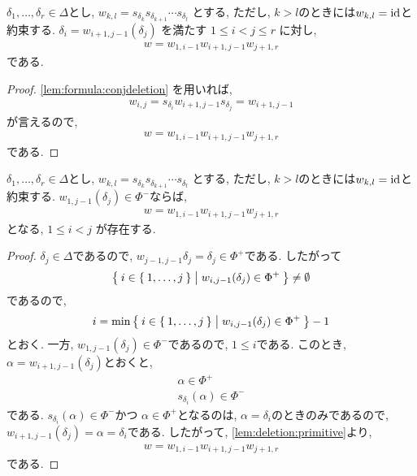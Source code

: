 \begin{lemma}
  \label{lem:deletion:primitive}
  $\delta_1,\ldots,\delta_r \in\Delta$とし,
  $w_{k,l}=s_{\delta_k}s_{\delta_{k+1}}\cdots s_{\delta_l}$
  とする, ただし, $k>l$のときには$w_{k,l}=\operatorname{id}$と約束する.
  $\delta_i=w_{i+1,j-1}(\delta_j)$
  を満たす $1\leq i < j \leq r$
  に対し,
  \begin{align*}
    w=w_{1,i-1}w_{i+1,j-1}w_{j+1,r}
  \end{align*}
  である.
\end{lemma}

\begin{proof}
  \cref{lem:formula:conjdeletion}
  を用いれば,
  \begin{align*}
    w_{i,j}=
    s_{\delta_i}w_{i+1,j-1}s_{\delta_j}
    =w_{i+1,j-1}
  \end{align*}
  が言えるので,
  \begin{align*}
    w=w_{1,i-1}w_{i+1,j-1}w_{j+1,r}
  \end{align*}
  である.
\end{proof}

\begin{lemma}
  \label{lem:deletion:primitive:fixed4i}
  $\delta_1,\ldots,\delta_r \in\Delta$とし,
  $w_{k,l}=s_{\delta_k}s_{\delta_{k+1}}\cdots s_{\delta_l}$
  とする, ただし, $k>l$のときには$w_{k,l}=\operatorname{id}$と約束する.
  $w_{1,j-1}(\delta_{j})\in\Phi^-$ならば,
  \begin{align*}
    w=w_{1,i-1}w_{i+1,j-1}w_{j+1,r}
  \end{align*}
  となる, $1\leq i < j$
  が存在する.
\end{lemma}

\begin{proof}
  $\delta_{j}\in\Delta$であるので, 
  $w_{j-1,j-1}\delta_{j}=\delta_{j}\in\Phi^+$である.
  したがって
  \begin{align*}
    \Set{i\in\Set{1,\ldots,j}|w_{i,j-1}(\delta_{j})\in\Phi^+}\neq \emptyset
  \end{align*}
  であるので,
  \begin{align*}
    i=\min\Set{i\in\Set{1,\ldots,j}|w_{i,j-1}(\delta_{j})\in\Phi^+}-1
  \end{align*}
  とおく.
  一方, $w_{1,j-1}(\delta_{j})\in\Phi^-$であるので,
  $1\leq i$である. このとき,
  $\alpha=w_{i+1,j-1}(\delta_{j})$とおくと,
  \begin{align*}
    \alpha\in \Phi^+\\
   s_{\delta_{i}} (\alpha)\in \Phi^-
  \end{align*}
  である.
  $s_{\delta_{i}}(\alpha)\in \Phi^-$かつ
  $\alpha \in \Phi^+$となるのは,
  $\alpha=\delta_i$のときのみであるので,
  $w_{i+1,j-1}(\delta_{j})=\alpha=\delta_i$である.
  したがって, \cref{lem:deletion:primitive}より,
  \begin{align*}
    w=w_{1,i-1}w_{i+1,j-1}w_{j+1,r}
  \end{align*}
  である.
\end{proof}

